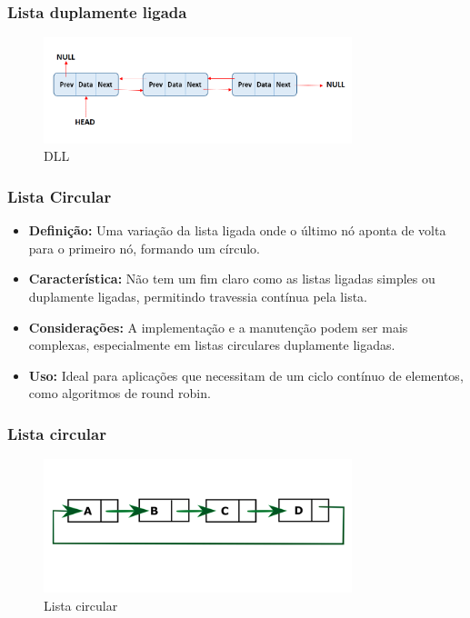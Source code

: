 \begin{frame}[fragile]
  \frametitle{Lista duplamente ligada}
  \begin{figure}
    \centering
    \includegraphics[width=0.8\textwidth]{aulas/aula3-dll.png}
    \caption{DLL}
  \end{figure}
\end{frame}
\begin{frame}[fragile]
  \frametitle{Lista Circular}
  \begin{itemize}
    \item \textbf{Definição:} Uma variação da lista ligada onde o último nó aponta de volta para o primeiro nó, formando um círculo.
    \item \textbf{Característica:} Não tem um fim claro como as listas ligadas simples ou duplamente ligadas, permitindo travessia contínua pela lista.
    \item \textbf{Considerações:} A implementação e a manutenção podem ser mais complexas, especialmente em listas circulares duplamente ligadas.
    \item \textbf{Uso:} Ideal para aplicações que necessitam de um ciclo contínuo de elementos, como algoritmos de round robin.
  \end{itemize}
\end{frame}

\begin{frame}[fragile]
  \frametitle{Lista circular}
  \begin{figure}
    \centering
    \includegraphics[width=0.8\textwidth]{aulas/aula3-cll.png}
    \caption{Lista circular}
  \end{figure}
\end{frame}

